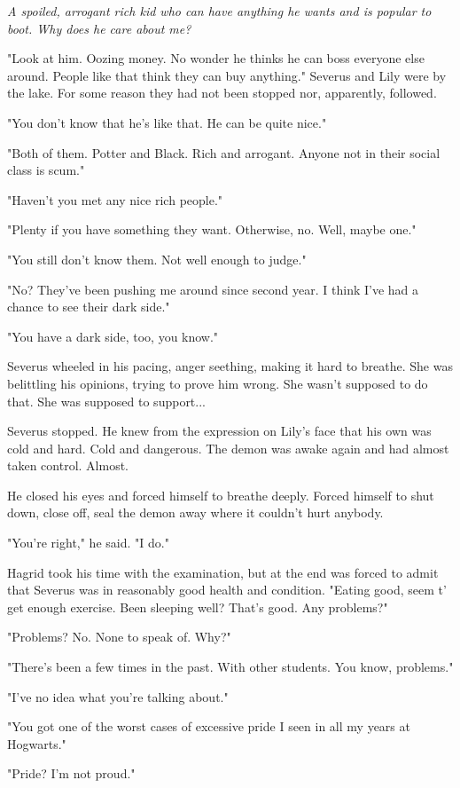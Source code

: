\documentclass[a4paper,11pt]{article}
\begin{document}
\emph{A spoiled, arrogant rich kid who can have anything he wants and is popular to boot. Why does he care about me?}

"Look at him. Oozing money. No wonder he thinks he can boss everyone else around. People like that think they can buy anything." Severus and Lily were by the lake. For some reason they had not been stopped nor, apparently, followed.

"You don't know that he's like that. He can be quite nice."

"Both of them. Potter and Black. Rich and arrogant. Anyone not in their social class is scum."

"Haven't you met any nice rich people."

"Plenty if you have something they want. Otherwise, no. Well, maybe one."

"You still don't know them. Not well enough to judge."

"No? They've been pushing me around since second year. I think I've had a chance to see their dark side."

"You have a dark side, too, you know."

Severus wheeled in his pacing, anger seething, making it hard to breathe. She was belittling his opinions, trying to prove him wrong. She wasn't supposed to do that. She was supposed to support...

Severus stopped. He knew from the expression on Lily's face that his own was cold and hard. Cold and dangerous. The demon was awake again and had almost taken control. Almost.

He closed his eyes and forced himself to breathe deeply. Forced himself to shut down, close off, seal the demon away where it couldn't hurt anybody.

"You're right," he said. "I do."

Hagrid took his time with the examination, but at the end was forced to admit that Severus was in reasonably good health and condition. "Eating good, seem t' get enough exercise. Been sleeping well? That's good. Any problems?"

"Problems? No. None to speak of. Why?"

"There's been a few times in the past. With other students. You know, problems."

"I've no idea what you're talking about."

"You got one of the worst cases of excessive pride I seen in all my years at Hogwarts."

"Pride? I'm not proud."
\end{document}
